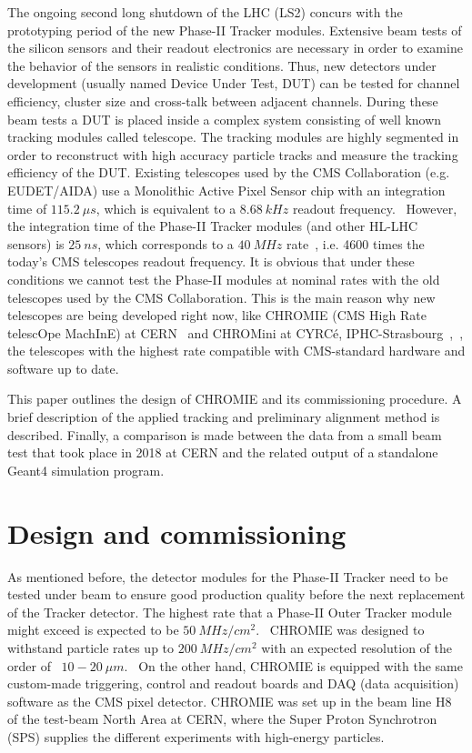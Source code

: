 \documentclass[a4paper,11pt]{article}
\begin{document}
The ongoing second long shutdown of the LHC (LS2) concurs with the prototyping period of the new Phase-II Tracker modules. Extensive beam tests of the silicon sensors and their readout electronics are necessary in order to examine the behavior of the sensors in realistic conditions. Thus, new detectors under development (usually named Device Under Test, DUT) can be tested for channel efficiency, cluster size and cross-talk between adjacent channels. During these beam tests a DUT is placed inside a complex system consisting of well known tracking modules called telescope. The tracking modules are highly segmented in order to reconstruct with high accuracy particle tracks and measure the tracking efficiency of the DUT. Existing telescopes used by the CMS Collaboration (e.g. EUDET/AIDA) use a Monolithic Active Pixel Sensor chip with an integration time of $115.2\: \mu s$, which is equivalent to a $8.68\: kHz$ readout frequency.~\cite{c} However, the integration time of the Phase-II Tracker modules (and other HL-LHC sensors) is $25\: ns$, which corresponds to a $40\: MHz$ rate~\cite{a}, i.e. 4600 times the today’s CMS telescopes readout frequency. It is obvious that under these conditions we cannot test the Phase-II modules at nominal rates with the old telescopes used by the CMS Collaboration. This is the main reason why new telescopes are being developed right now, like CHROMIE (CMS High Rate telescOpe MachInE) at CERN~\cite{d} and CHROMini at CYRCé, IPHC-Strasbourg~\cite{e},~\cite{f}, the telescopes with the highest rate compatible with CMS-standard hardware and software up to date.

This paper outlines the design of CHROMIE and its commissioning procedure. A brief description of the applied tracking and preliminary alignment method is described. Finally, a comparison is made between the data from a small beam test that took place in 2018 at CERN and the related output of a standalone Geant4 simulation program.

\section{Design and commissioning}
As mentioned before, the detector modules for the Phase-II Tracker need to be tested under beam to ensure good production quality before the next replacement of the Tracker detector. The highest rate that a Phase-II Outer Tracker module might exceed is expected to be $50\: MHz/cm^2$.~\cite{b} CHROMIE was designed to withstand particle rates up to $200\: MHz/cm^2$ with an expected resolution of the order of ~$10-20\: \mu m$.~\cite{d} On the other hand, CHROMIE is equipped with the same custom-made triggering, control and readout boards and DAQ (data acquisition) software as the CMS pixel detector. CHROMIE was set up in the beam line H8 of the test-beam North Area at CERN, where the Super Proton Synchrotron (SPS) supplies the different experiments with high-energy particles.
\end{document}
